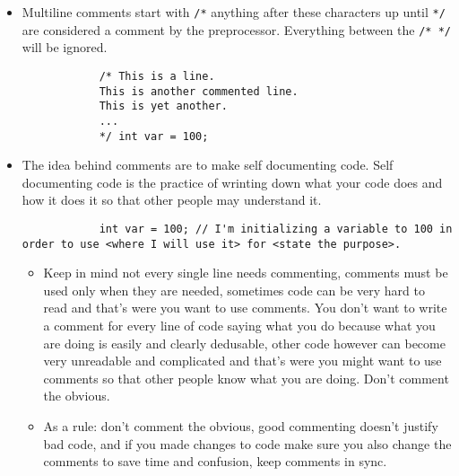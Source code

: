 \begin{itemize}
    \item Multiline comments start with \texttt{/*} anything after these characters up until \texttt{*/} are considered a comment by the preprocessor. Everything between the \texttt{/* */} will be ignored.
        \begin{verbatim}
            /* This is a line.
            This is another commented line.
            This is yet another. 
            ... 
            */ int var = 100;
        \end{verbatim}
    \item The idea behind comments are to make self documenting code. Self documenting code is the practice of wrinting down what your code does and how it does it so that other people may understand it.
        \begin{verbatim}
            int var = 100; // I'm initializing a variable to 100 in order to use <where I will use it> for <state the purpose>.
        \end{verbatim}
        \begin{itemize}
            \item Keep in mind not every single line needs commenting, comments must be used only when they are needed, sometimes code can be very hard to read and that's were you want to use comments. You don't want to write a comment for every line of code saying what you do because what you are doing is easily and clearly dedusable, other code however can become very unreadable and complicated and that's were you might want to use comments so that other people know what you are doing. Don't comment the obvious.
            \item As a rule: don't comment the obvious, good commenting doesn't justify bad code, and if you made changes to code make sure you also change the comments to save time and confusion, keep comments in sync.
        \end{itemize}
\end{itemize}


